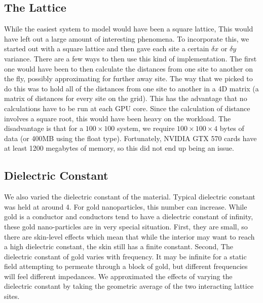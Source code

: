 \subsection{The Lattice}
While the easiest system to model would have been a square lattice, This would have left out a large amount of interesting phenomena. To incorporate this, we started out with a square lattice and then gave each site a certain $\delta x$ or $\delta y$ variance. There are a few ways to then use this kind of implementation. The first one would have been to then calculate the distances from one site to another on the fly, possibly approximating for further away site. The way that we picked to do this was to hold all of the distances from one site to another in a 4D matrix (a matrix of distances for every site on the grid). This has the advantage that no calculations have to be run at each GPU core. Since the calculation of distance involves a square root, this would have been heavy on the workload. The disadvantage is that for a $100 \times 100 $ system, we require $100 \times 100 \times 4$ bytes of data (or 400MB using the float type). Fortunately, NVIDIA GTX 570 cards have at least 1200 megabytes of memory, so this did not end up being an issue.

\subsection{Dielectric Constant}
We also varied the dielectric constant of the material. Typical dielectric constant was held at around 4. For gold nanoparticles, this number can increase. While gold is a conductor and conductors tend to have a dielectric constant of infinity, these gold nano-particles are in very special situation. First, they are small, so there are skin-level effects which mean that while the interior may want to reach a high dielectric constant, the skin still has a finite constant. Second, The dielectric constant of gold varies with frequency. It may be infinite for a static field attempting to permeate through a block of gold, but different frequencies will feel different impedances. We approximated the effects of varying the dielectric constant by taking the geometric average of the two interacting lattice sites. 

